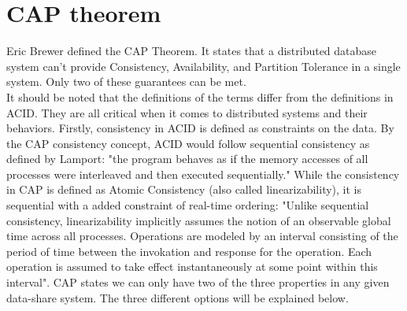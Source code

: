 \documentclass[a4paper,10pt,titlepage]{report}
\begin{document}
    \section{CAP theorem}

    Eric Brewer defined the CAP Theorem\cite{CAP}. It states that a distributed database system can't provide Consistency, Availability, and Partition Tolerance in a single system. Only two of these guarantees can be met.\\
    \vspace{5mm}
    It should be noted that the definitions of the terms differ from the definitions in ACID. They are all critical when it comes to distributed systems and their behaviors. Firstly, consistency in ACID is defined as constraints on the data. By the CAP consistency concept, ACID would follow sequential consistency as defined by Lamport\cite{lamport1993how}: "the program behaves as if the memory accesses of all processes were interleaved and then executed sequentially." While the consistency in CAP is defined as Atomic Consistency (also called linearizability), it is sequential with a added constraint of real-time ordering: "Unlike sequential consistency, linearizability implicitly assumes the notion of an observable global time across all processes. Operations are modeled by an interval consisting of the period of time between the invokation and response for the operation. Each operation is assumed to take effect instantaneously at some point within this interval". \cite{CSL-TR-95-685}
    \vspace{5mm}
    CAP states we can only have two of the three properties in any given data-share system. The three different options will be explained below.
\end{document}
